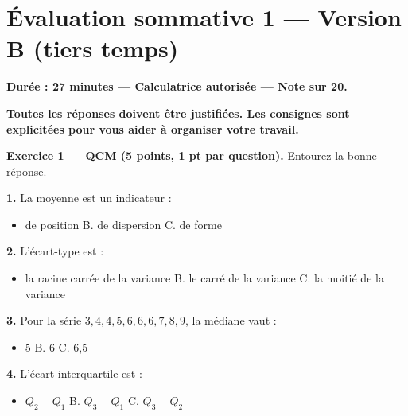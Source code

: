 \documentclass[11pt,a4paper]{article}
\begin{document}
\newpage

\section*{Évaluation sommative 1 — Version B (tiers temps)}

\begin{sommativeTT}[title={\textbf{Évaluation sommative 1 — Version B (tiers temps, 27 minutes)}}]
\textbf{Durée : 27 minutes — Calculatrice autorisée — Note sur 20.}

\vspace{0.2cm}
\textbf{Toutes les réponses doivent être justifiées. Les consignes sont explicitées pour vous aider à organiser votre travail.}

\vspace{0.4cm}
\textbf{Exercice 1 — QCM (5 points, 1 pt par question).} Entourez la bonne réponse.

\vspace{0.3cm}
\textbf{1.} La moyenne est un indicateur :
\begin{itemize}[leftmargin=1.2cm, itemsep=1pt]
    \item[A.] de position \hspace{2cm} B. de dispersion \hspace{2cm} C. de forme
\end{itemize}

\textbf{2.} L'écart-type est :
\begin{itemize}[leftmargin=1.2cm, itemsep=1pt]
    \item[A.] la racine carrée de la variance \hspace{2cm} B. le carré de la variance \hspace{2cm} C. la moitié de la variance
\end{itemize}

\textbf{3.} Pour la série \(3, 4, 4, 5, 6, 6, 6, 7, 8, 9\), la médiane vaut :
\begin{itemize}[leftmargin=1.2cm, itemsep=1pt]
    \item[A.] 5 \hspace{2cm} B. 6 \hspace{2cm} C. 6,5
\end{itemize}

\textbf{4.} L'écart interquartile est :
\begin{itemize}[leftmargin=1.2cm, itemsep=1pt]
    \item[A.] \(Q_2 - Q_1\) \hspace{2cm} B. \(Q_3 - Q_1\) \hspace{2cm} C. \(Q_3 - Q_2\)
\end{itemize}


\end{sommativeTT}
\end{document}
